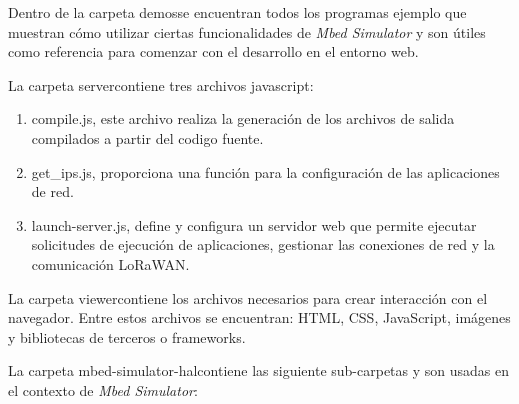 Dentro de la carpeta \textquotedbl demos\textquotedbl se encuentran todos los programas ejemplo que muestran cómo utilizar ciertas funcionalidades de \textit{Mbed Simulator} y son útiles como referencia para comenzar con el desarrollo en el entorno web. 
 
La carpeta \textquotedbl server\textquotedbl contiene tres archivos javascript: 

\begin{enumerate}
	\item compile.js, este archivo realiza la generación de los archivos de salida compilados a partir del codigo fuente.
	
	\item get\_ips.js, proporciona una función para la configuración de las aplicaciones de red.

	\item launch-server.js, define y configura un servidor web que permite ejecutar solicitudes de ejecución de aplicaciones, gestionar las conexiones de red y la comunicación LoRaWAN.
	
\end{enumerate}
 
La carpeta \textquotedbl viewer\textquotedbl contiene los archivos necesarios para crear interacción con el navegador. Entre estos archivos se encuentran: HTML, CSS, JavaScript, imágenes y bibliotecas de terceros o frameworks.
 
La carpeta \textquotedbl mbed-simulator-hal\textquotedbl contiene las siguiente sub-carpetas y son usadas en el contexto de \textit{Mbed Simulator}: 

